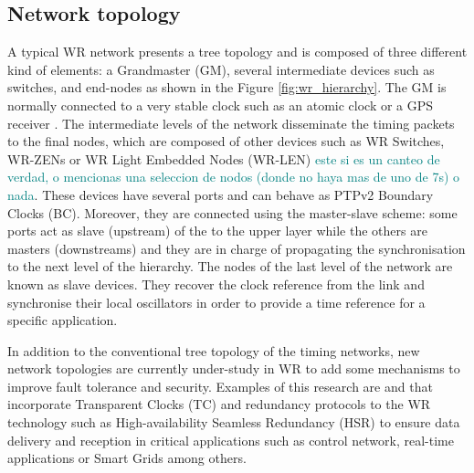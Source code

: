 \subsection{Network topology} \label{subsec:wr-net}

A typical WR network presents a tree topology and is composed of three different
kind of elements: a Grandmaster (GM), several intermediate devices such as
switches, and end-nodes as shown in the Figure \ref{fig:wr_hierarchy}. The GM
is normally connected to a very stable clock such as an atomic clock or a GPS
receiver \cite{Daniluk2012}. The intermediate levels of the network disseminate
the timing packets to the final nodes, which are composed of other devices such
as WR Switches, WR-ZENs or WR Light Embedded Nodes (WR-LEN) 
\textcolor{teal}{este si es un canteo de verdad, o mencionas una seleccion de 
nodos (donde no haya mas de uno de 7s) o nada}. These devices have
several ports and can behave as PTPv2 Boundary Clocks (BC). Moreover, they are
connected using the master-slave scheme: some ports act as slave (upstream)
of the to the upper layer while the others are masters (downstreams) and
they are in charge of propagating the synchronisation to the next level of the
hierarchy. The nodes of the last level of the network are known as slave devices.
They recover the clock reference from the link and synchronise their local
oscillators in order to provide a time reference for a specific application.

In addition to the conventional tree topology of the timing networks, new
network topologies are currently under-study in WR to add some mechanisms to improve fault
tolerance and security. Examples of this research are
\cite{jlgutierrez-paper-redundancy} and \cite{jlgutierrezhsr} that incorporate Transparent Clocks
(TC) and redundancy protocols to the WR technology such as
High-availability Seamless Redundancy (HSR) to ensure data delivery and reception in critical applications such as
control network, real-time applications or Smart Grids among others.

